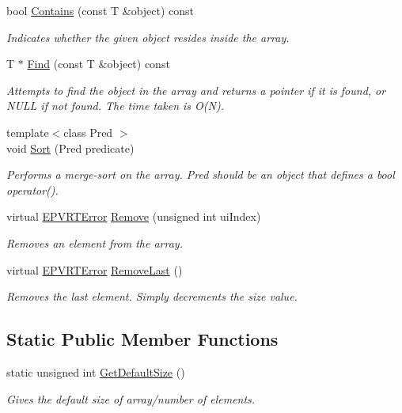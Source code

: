 \begin{DoxyCompactItemize}
bool \hyperlink{class_c_p_v_r_t_array_aa0313bae1c1ac847226cf0fc9f63e55f}{Contains} (const T \&object) const 
\begin{DoxyCompactList}\small\item\em Indicates whether the given object resides inside the array. \end{DoxyCompactList}\item 
T $\ast$ \hyperlink{class_c_p_v_r_t_array_a09de4d5914fd9f561fdd11f617917276}{Find} (const T \&object) const 
\begin{DoxyCompactList}\small\item\em Attempts to find the object in the array and returns a pointer if it is found, or N\+U\+L\+L if not found. The time taken is O(\+N). \end{DoxyCompactList}\item 
{\footnotesize template$<$class Pred $>$ }\\void \hyperlink{class_c_p_v_r_t_array_a06146968ca2a96bfd0678eee433c57cf}{Sort} (Pred predicate)
\begin{DoxyCompactList}\small\item\em Performs a merge-\/sort on the array. Pred should be an object that defines a bool operator(). \end{DoxyCompactList}\item 
virtual \hyperlink{_p_v_r_t_error_8h_a9e837ff1a83f3a5f332bc4cc78454608}{E\+P\+V\+R\+T\+Error} \hyperlink{class_c_p_v_r_t_array_a152331cd27411d227f7dfaa995ffed01}{Remove} (unsigned int ui\+Index)
\begin{DoxyCompactList}\small\item\em Removes an element from the array. \end{DoxyCompactList}\item 
virtual \hyperlink{_p_v_r_t_error_8h_a9e837ff1a83f3a5f332bc4cc78454608}{E\+P\+V\+R\+T\+Error} \hyperlink{class_c_p_v_r_t_array_ad804568ace15ce5c5bac5bd331ffab95}{Remove\+Last} ()
\begin{DoxyCompactList}\small\item\em Removes the last element. Simply decrements the size value. \end{DoxyCompactList}\end{DoxyCompactItemize}
\subsection*{Static Public Member Functions}
\begin{DoxyCompactItemize}
\item 
static unsigned int \hyperlink{class_c_p_v_r_t_array_a92dd6820659c792331a86607cf48d767}{Get\+Default\+Size} ()
\begin{DoxyCompactList}\small\item\em Gives the default size of array/number of elements. \end{DoxyCompactList}\end{DoxyCompactItemize}
